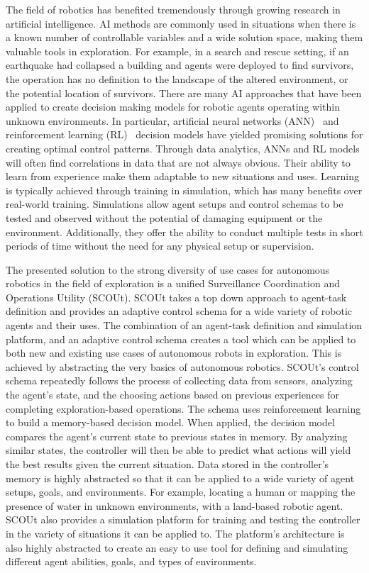 The field of robotics has benefited tremendously through growing research in artificial intelligence.
AI methods are commonly used in situations when there is a known number of controllable variables and a wide solution space, making them valuable tools in exploration.
For example, in a search and rescue setting, if an earthquake had collapsed a building and agents were deployed to find survivors, the operation has no definition to the landscape of the altered environment, or the potential location of survivors.
There are many AI approaches that have been applied to create decision making models for robotic agents operating within unknown environments.
In particular, artificial neural networks (ANN)~\cite{kiumarsi_optimal_2018, arulkumaran_brief_2017, tai_autonomous_2017, bai_toward_2017} and reinforcement learning (RL)~\cite{kiumarsi_optimal_2018, arulkumaran_brief_2017, sutton_reinforcement_1998} decision models have yielded promising solutions for creating optimal control patterns.
Through data analytics, ANNs and RL models will often find correlations in data that are not always obvious.
Their ability to learn from experience make them adaptable to new situations and uses.
Learning is typically achieved through training in simulation, which has many benefits over real-world training.
Simulations allow agent setups and control schemas to be tested and observed without the potential of damaging equipment or the environment.
Additionally, they offer the ability to conduct multiple tests in short periods of time without the need for any physical setup or supervision.

The presented solution to the strong diversity of use cases for autonomous robotics in the field of exploration is a unified Surveillance Coordination and Operations Utility (SCOUt).
SCOUt takes a top down approach to agent-task definition and provides an adaptive control schema for a wide variety of robotic agents and their uses.
The combination of an agent-task definition and simulation platform, and an adaptive control schema creates a tool which can be applied to both new and existing use cases of autonomous robots in exploration.
This is achieved by abstracting the very basics of autonomous robotics.
SCOUt's control schema repeatedly follows the process of collecting data from sensors, analyzing the agent's state, and the choosing actions based on previous experiences for completing exploration-based operations.
The schema uses reinforcement learning to build a memory-based decision model.
When applied, the decision model compares the agent's current state to previous states in memory.
By analyzing similar states, the controller will then be able to predict what actions will yield the best results given the current situation.
Data stored in the controller's memory is highly abstracted so that it can be applied to a wide variety of agent setups, goals, and environments.
For example, locating a human or mapping the presence of water in unknown environments, with a land-based robotic agent.
SCOUt also provides a simulation platform for training and testing the controller in the variety of situations it can be applied to.
The platform's architecture is also highly abstracted to create an easy to use tool for defining and simulating different agent abilities, goals, and types of environments.

